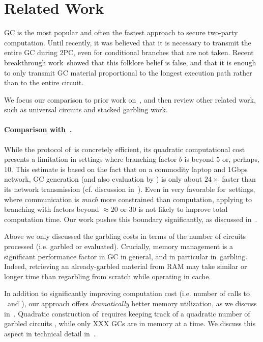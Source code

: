 \section{Related Work}\label{sec:relwork}


GC is the most popular and often the fastest approach to secure two-party computation.  Until recently, it was believed that it is necessary
to transmit the entire GC during 2PC, even for conditional branches that
are not taken.  Recent breakthrough work~\HK showed that this folklore belief is false, and that  it is enough to only transmit GC material  proportional to the
longest execution path rather than to the entire circuit.

We focus our comparison to prior work on~\HK, and then review other related work, such as universal circuits and  stacked garbling work.


\paragraph{Comparison with~\HK.}
While the protocol of~\HK is concretely efficient, its quadratic computational cost presents a  limitation in settings where branching factor $b$ is beyond $5$ or, perhaps, $10$.  This estimate is based on the fact that on a commodity laptop and 1Gbps network, GC generation (and also evaluation by \E) is only about $24\times$ faster than its network transmission (cf. discussion in~).  Even in very favorable for~\HK settings, where communication is {\em much} more constrained than computation, applying \HK to branching with factors beyond $\approx 20$ or $30$ is not likely to improve total computation time.  Our work pushes this boundary significantly, as discussed in~. 

Above we only discussed the garbling costs in terms of the number of circuits processed (i.e. garbled or evaluated).  Crucially, memory management is a significant performance factor in GC in general, and in particular in~\HK garbling.  Indeed, retrieving an already-garbled material from RAM may take similar or longer time than regarbling from scratch while operating in cache.

In addition to significantly improving computation cost (i.e. number of calls to \Gb\ and \Ev), our approach offers {\em dramatically} better memory utilization, as we discuss in~.  Quadratic construction of~\HK requires keeping track of a quadratic number of garbled circuits , while only XXX GCs are in memory at a time.  We discuss this aspect in technical detail in~.

